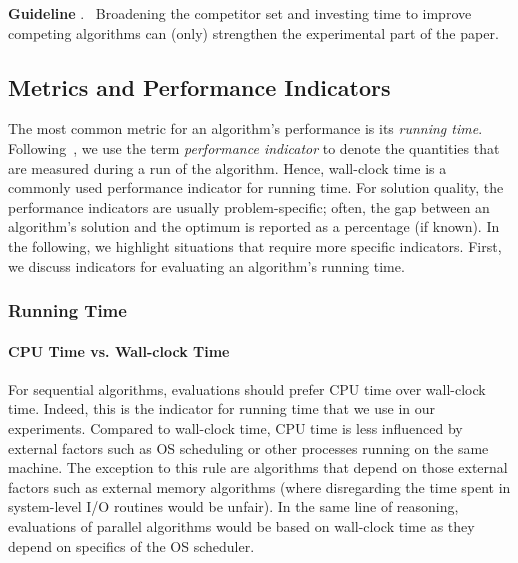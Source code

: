 \documentclass[algorithms,article,submit,moreauthors,pdftex]{Definitions/mdpi}
\newcounter{guideline}
\newcommand{\changed}[1]{#1}
\newcommand{\guideline}[1]{\par\smallskip\textbf{Guideline \theguideline\stepcounter{guideline}}.
\ #1\par\smallskip}
\begin{document}
\changed{\guideline{Broadening the competitor set and investing time to improve competing
algorithms can (only) strengthen the experimental part of the paper.}}

\subsection{Metrics \changed{and Performance Indicators}}
\label{sub:metrics}
%
The most common metric for an algorithm's performance is its \emph{running time}.
\changed{Following~\cite{McGeoch12}, we use the term \emph{performance
indicator} to denote the quantities that are measured during a run of the
algorithm. Hence, wall-clock time is a commonly used performance indicator
for running time.}
For solution quality, the \changed{performance indicators} are usually problem-specific;
often, the gap between an algorithm's solution and the optimum is reported
as a percentage (if known).
In the following, we highlight situations that require more specific \changed{indicators}.
First, we discuss \changed{indicators} for evaluating an algorithm's running time.

\subsubsection{Running Time}

\paragraph*{CPU Time vs. Wall-clock Time}
%
For sequential algorithms, evaluations should prefer CPU time over wall-clock time.
Indeed, this is the \changed{indicator for} running time that we use in our \kad experiments.
Compared to wall-clock time, CPU time is less influenced by external factors
such as OS scheduling or other processes running on the same machine.
The exception to this rule are algorithms that depend on those external factors
such as external memory algorithms (where disregarding the time spent in
system-level I/O routines would be unfair).
In the same line of reasoning, evaluations of parallel algorithms would be
based on wall-clock time as they depend on specifics of the OS scheduler.
\end{document}
